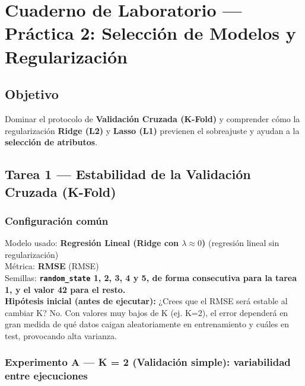 \documentclass[../../__memoria.tex]{subfiles}
\begin{document}
\standalonecover
\pagestyle{cuerpo}

\graphicspath{{\subfix{../../Imagenes/}}{../../Imagenes/}{\subfix{img/}}{img/}}

\chapter[Práctica 2: Selección de Modelos]{Cuaderno de Laboratorio --- Práctica 2: Selección de Modelos y Regularización}

\section*{Objetivo}
Dominar el protocolo de \textbf{Validación Cruzada (K-Fold)} y comprender cómo la regularización
\textbf{Ridge (L2)} y \textbf{Lasso (L1)} previenen el sobreajuste y ayudan a la \textbf{selección de atributos}.


\section[Tarea 1: Estabilidad K-Fold]{Tarea 1 --- Estabilidad de la Validación Cruzada (K-Fold)}

\subsection*{Configuración común}
Modelo usado: \textbf{Regresión Lineal (Ridge con $\lambda \approx 0$)} (regresión lineal sin regularización)\\
Métrica: \textbf{RMSE} (RMSE)\\
Semillas: \textbf{\texttt{random\_state} 1, 2, 3, 4 y 5, de forma consecutiva para la tarea 1, y el valor 42 para el resto.}\\

\vspace{0.3cm}
\noindent\textbf{Hipótesis inicial (antes de ejecutar):}
¿Crees que el RMSE será estable al cambiar K? No. Con valores muy bajos de K (ej. K=2), el error dependerá en gran medida de qué datos caigan aleatoriamente en entrenamiento y cuáles en test, provocando alta varianza.

\vspace{0.5cm}

\subsection{Experimento A --- K = 2 (Validación simple): variabilidad entre ejecuciones}
\end{document}
